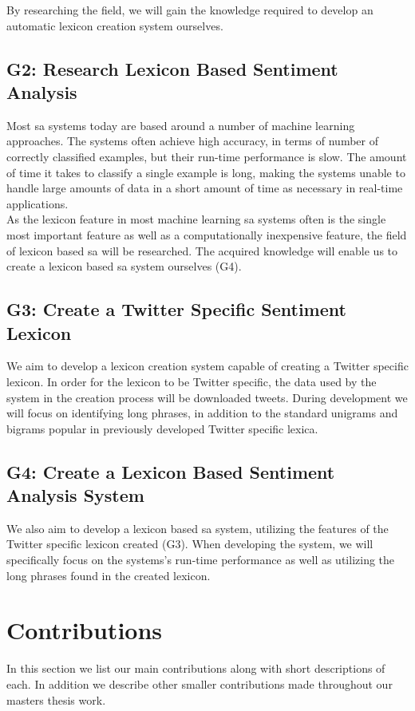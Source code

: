 By researching the field, we will gain the knowledge required to develop an automatic lexicon creation system ourselves.

\subsection*{G2: Research Lexicon Based Sentiment Analysis}
Most \ac{sa} systems today are based around a number of machine learning approaches. The systems often achieve high accuracy, in terms of number of correctly classified examples, but their run-time performance is slow. The amount of time it takes to classify a single example is long, making the systems unable to handle large amounts of data in a short amount of time as necessary in real-time applications.  \\

As the lexicon feature in most machine learning \ac{sa} systems often is the single most important feature as well as a computationally inexpensive feature, the field of lexicon based \ac{sa} will be researched. The acquired knowledge will enable us to create a lexicon based \ac{sa} system ourselves (G4).  

\subsection*{G3: Create a Twitter Specific Sentiment Lexicon}
We aim to develop a lexicon creation system capable of creating a Twitter specific lexicon. In order for the lexicon to be Twitter specific, the data used by the system in the creation process will be downloaded tweets. During development we will focus on identifying long phrases, in addition to the standard unigrams and bigrams popular in previously developed Twitter specific lexica.

\subsection*{G4: Create a Lexicon Based Sentiment Analysis System}
We also aim to develop a lexicon based \ac{sa} system, utilizing the features of the Twitter specific lexicon created (G3). When developing the system, we will specifically focus on the systems's run-time performance as well as utilizing the long phrases found in the created lexicon.  


\section{Contributions}
In this section we list our main contributions along with short descriptions of each. In addition we describe other smaller contributions made throughout our masters thesis work. 

